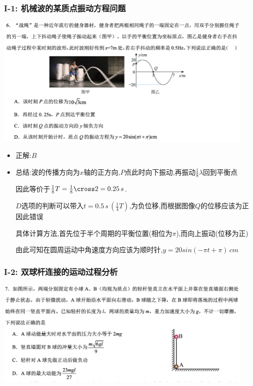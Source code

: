 \documentclass{article}
\begin{document}
\subsubsection{I-1: 机械波的某质点振动方程问题}
\includegraphics[width=0.95\textwidth,keepaspectratio]{./pictures/3.11-1.png}

\begin{itemize}
    \item 正解:\quad $B$
    \item 总结:\quad 波的传播方向为$x$轴的正方向,$P$点此时向下振动,再振动$\frac{1}{8} \lambda$回到平衡点

          \hspace{3.2em}因此等价于$\frac{1}{8} T = \frac{1}{8} \cross 2 = 0.25 \,s $.

          \hspace{3.2em}$D$选项的判断可以带入$t = 0.5 \,s \, (\frac{1}{4}T)$,为负位移,而根据图像$Q$的位移应该为正因此错误

          \hspace{3.2em}具体计算方法,首先位于半个周期的平衡位置(相位为$\pi$),而向上振动(位移为正)

          \hspace{3.2em}由此可知在圆周运动中角速度方向应该为顺时针,$y = 20 sin(-\pi t + \pi) \, cm$
\end{itemize}

\vspace{2em}

\subsubsection{I-2: 双球杆连接的运动过程分析}
\includegraphics[width=0.95\textwidth,keepaspectratio]{./pictures/3.11-6.png}
\end{document}
